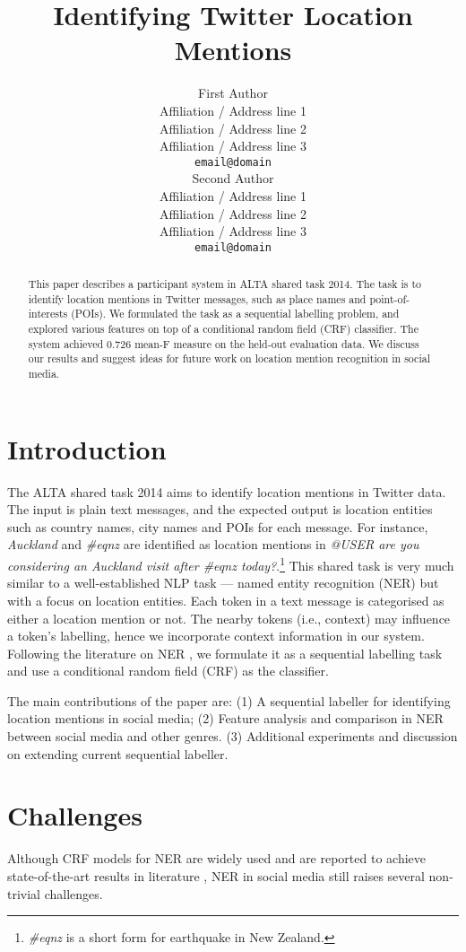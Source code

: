 \documentclass[11pt]{article}
\title{Identifying Twitter Location Mentions}
\author{First Author \\
  Affiliation / Address line 1 \\
  Affiliation / Address line 2 \\
  Affiliation / Address line 3 \\
  {\tt email@domain} \\\And
  Second Author \\
  Affiliation / Address line 1 \\
  Affiliation / Address line 2 \\
  Affiliation / Address line 3 \\
  {\tt email@domain} \\}
\date{}
\newcommand{\ie}{i.e.,\xspace}
\newcommand{\myex}[1]{\textit{#1}}
\begin{document}
\maketitle
\begin{abstract}
    This paper describes a participant system in ALTA shared task 2014.
    The task is to identify location mentions in Twitter messages, such as place names and point-of-interests (POIs).
    We formulated the task as a sequential labelling problem, and explored various features on top of a conditional random field (CRF) classifier.
    The system achieved 0.726 mean-F measure on the held-out evaluation data.
    We discuss our results and suggest ideas for future work on location mention recognition in social media.
\end{abstract}

\section{Introduction}
\label{sec:intro}
The ALTA shared task 2014 aims to identify location mentions in Twitter data.
The input is plain text messages, and the expected output is location entities such as country names, city names and POIs for each message.
For instance, \myex{Auckland} and \myex{\#eqnz} are identified as location mentions in \myex{@USER are you considering an Auckland visit after \#eqnz today?}.\footnote{\myex{\#eqnz} is a short form for earthquake in New Zealand.}
This shared task is very much similar to a well-established NLP task --- named entity recognition (NER) but with a focus on location entities.
Each token in a text message is categorised as either a location mention or not.
The nearby tokens (\ie context) may influence a token's labelling, hence we incorporate context information in our system.
Following the literature on NER \cite{wwwc13ling}, we formulate it as a sequential labelling task and use a conditional random field (CRF) as the classifier.

The main contributions of the paper are:
(1) A sequential labeller for identifying location mentions in social media;
(2) Feature analysis and comparison in NER between social media and other genres.
(3) Additional experiments and discussion on extending current sequential labeller.

\section{Challenges}
\label{sec:challenge}
Although CRF models for NER are widely used and are reported to achieve state-of-the-art results in literature \cite{acl05fink,acl11liux,emnlp11ritt}, NER in social media still raises several non-trivial challenges.
\end{document}
